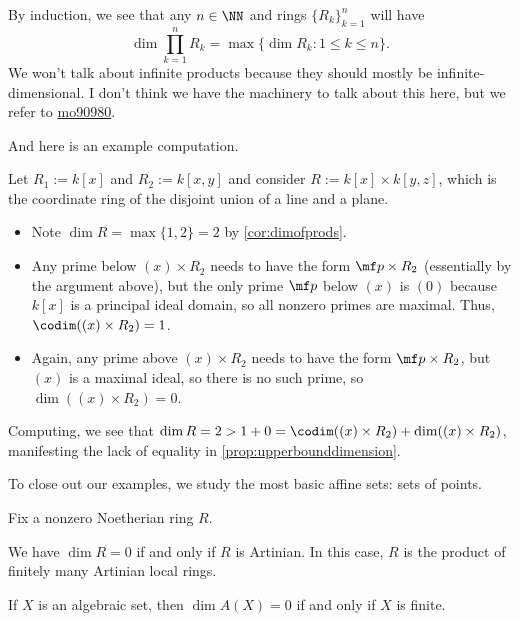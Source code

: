 \begin{remark}
	By induction, we see that any $n\in\NN$ and rings $\{R_k\}_{k=1}^n$ will have
	\[\dim\prod_{k=1}^nR_k=\max\{\dim R_k:1\le k\le n\}.\]
	We won't talk about infinite products because they should mostly be infinite-dimensional. I don't think we have the machinery to talk about this here, but we refer to \href{https://mathoverflow.net/q/90980/473811}{mo90980}.
\end{remark}
And here is an example computation.
\begin{example}
	Let $R_1:=k[x]$ and $R_2:=k[x,y]$ and consider $R:=k[x]\times k[y,z]$, which is the coordinate ring of the disjoint union of a line and a plane.
	\begin{itemize}
		\item Note $\dim R=\max\{1,2\}=2$ by \autoref{cor:dimofprods}.
		\item Any prime below $(x)\times R_2$ needs to have the form $\mf p\times R_2$ (essentially by the argument above), but the only prime $\mf p$ below $(x)$ is $(0)$ because $k[x]$ is a principal ideal domain, so all nonzero primes are maximal. Thus, $\codim((x)\times R_2)=1$.
		\item Again, any prime above $(x)\times R_2$ needs to have the form $\mf p\times R_2$, but $(x)$ is a maximal ideal, so there is no such prime, so $\dim((x)\times R_2)=0$.
	\end{itemize}
	Computing, we see that $\dim R=2>1+0=\codim((x)\times R_2)+\dim((x)\times R_2)$, manifesting the lack of equality in \autoref{prop:upperbounddimension}.
\end{example}
To close out our examples, we study the most basic affine sets: sets of points.
\begin{proposition}
	Fix a nonzero Noetherian ring $R$.
	\begin{listalph}
		\item We have $\dim R=0$ if and only if $R$ is Artinian. In this case, $R$ is the product of finitely many Artinian local rings.
		\item If $X$ is an algebraic set, then $\dim A(X)=0$ if and only if $X$ is finite.
	\end{listalph}
\end{proposition}
